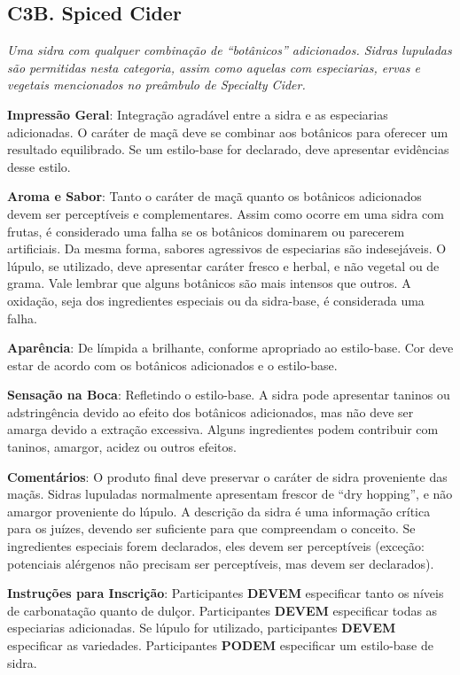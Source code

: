 \subsection*{C3B. Spiced Cider}

\textit{Uma sidra com qualquer combinação de “botânicos” adicionados. Sidras lupuladas são permitidas nesta categoria, assim como aquelas com especiarias, ervas e vegetais mencionados no preâmbulo de Specialty Cider.}

\textbf{Impressão Geral}: Integração agradável entre a sidra e as especiarias adicionadas. O caráter de maçã deve se combinar aos botânicos para oferecer um resultado equilibrado. Se um estilo-base for declarado, deve apresentar evidências desse estilo.

\textbf{Aroma e Sabor}: Tanto o caráter de maçã quanto os botânicos adicionados devem ser perceptíveis e complementares. Assim como ocorre em uma sidra com frutas, é considerado uma falha se os botânicos dominarem ou parecerem artificiais. Da mesma forma, sabores agressivos de especiarias são indesejáveis. O lúpulo, se utilizado, deve apresentar caráter fresco e herbal, e não vegetal ou de grama. Vale lembrar que alguns botânicos são mais intensos que outros. A oxidação, seja dos ingredientes especiais ou da sidra-base, é considerada uma falha.

\textbf{Aparência}: De límpida a brilhante, conforme apropriado ao estilo-base. Cor deve estar de acordo com os botânicos adicionados e o estilo-base.

\textbf{Sensação na Boca}: Refletindo o estilo-base. A sidra pode apresentar taninos ou adstringência devido ao efeito dos botânicos adicionados, mas não deve ser amarga devido a extração excessiva. Alguns ingredientes podem contribuir com taninos, amargor, acidez ou outros efeitos.

\textbf{Comentários}: O produto final deve preservar o caráter de sidra proveniente das maçãs. Sidras lupuladas normalmente apresentam frescor de “dry hopping”, e não amargor proveniente do lúpulo. A descrição da sidra é uma informação crítica para os juízes, devendo ser suficiente para que compreendam o conceito. Se ingredientes especiais forem declarados, eles devem ser perceptíveis (exceção: potenciais alérgenos não precisam ser perceptíveis, mas devem ser declarados).

\textbf{Instruções para Inscrição}: Participantes \textbf{DEVEM} especificar tanto os níveis de carbonatação quanto de dulçor. Participantes \textbf{DEVEM} especificar todas as especiarias adicionadas. Se lúpulo for utilizado, participantes \textbf{DEVEM} especificar as variedades. Participantes \textbf{PODEM} especificar um estilo-base de sidra.

